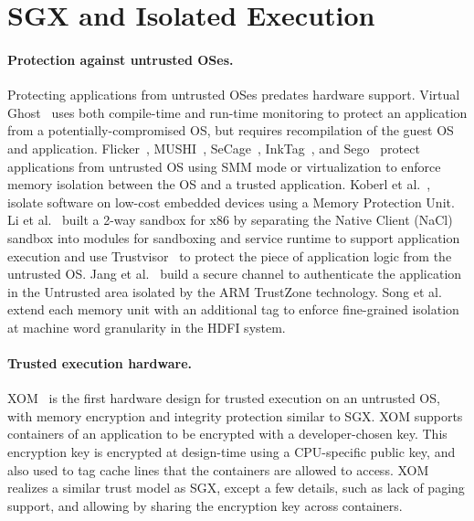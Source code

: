 \section{SGX and Isolated Execution}
\label{sec:related:sgx}

%
%
%


\paragraph{Protection against untrusted OSes.}
Protecting applications from untrusted OSes predates hardware support. 
Virtual Ghost~\cite{criswell2014virtualghost} uses both compile-time and run-time monitoring to protect an application
from a potentially-compromised OS, but requires recompilation of the guest OS and application.
Flicker~\cite{flicker}, MUSHI~\cite{zhang2012mushi}, SeCage~\cite{liu15secage}, InkTag~\cite{inktag}, and Sego~\cite{kwon16sego-sigops} protect applications from untrusted OS using SMM mode or virtualization
to enforce memory isolation between the OS and a trusted application.
Koberl et al.~\cite{koeberl2014trustlite}, isolate software on low-cost embedded devices using a Memory Protection Unit.
Li et al.~\cite{li2014minibox} built a 2-way sandbox for x86 by separating the Native Client (NaCl)~\cite{yee2009native} sandbox into modules for sandboxing and service runtime to support application execution and use Trustvisor~\cite{trustvisor} to protect the piece of application logic from the untrusted OS.
Jang et al.~\cite{jang2015secret} build a secure channel to authenticate the application in the Untrusted area isolated by the ARM TrustZone technology.
Song et al.~\cite{songhdfi} extend each memory unit with an additional tag
to enforce fine-grained isolation at machine word granularity in the HDFI system.

\paragraph{Trusted execution hardware.}
XOM~\cite{lie2003implementing} is the first hardware design for trusted execution on an untrusted OS,
with memory encryption and integrity protection similar to SGX. XOM supports containers of an application to be encrypted with a developer-chosen key. This encryption key is encrypted at design-time using a CPU-specific public key, and also used to tag cache lines that the containers are allowed to access.
XOM realizes a similar trust model as SGX, except a few details, such as lack of paging support, and allowing  by sharing the encryption key across containers.

